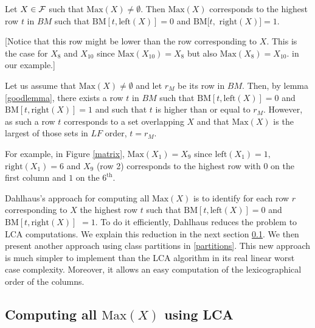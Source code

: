 \documentclass{llncs}
\begin{document}
\begin{lemma}
Let $X\in {\cal F}$ such that $\mbox{Max}(X)\not=\emptyset.$ Then
$\mbox{Max}(X)$ corresponds to the highest row $t$ in $BM$ such that
$\mbox{BM}[t,\mbox{left}(X)]=0$ and $\mbox{BM}[t,$ $\mbox{right}(X)]=1.$
\label{lemup}
\end{lemma}
\vspace*{-3mm}
[Notice that this row might be lower than the row corresponding to
  $X$. This is the case for $X_8$ and $X_{10}$ since
  $\mbox{Max}(X_{10})=X_8$ but also $\mbox{Max}(X_8)=X_{10}.$ in our example.]\\[3mm]
\begin{preuve}
 Let us assume that $\mbox{Max}(X)\not=\emptyset$ and let $r_M$ be its
 row in $BM.$ Then, by lemma \ref{goodlemma}, there exists a row $t$
 in $BM$ such that $\mbox{BM}[t,\mbox{left}(X)]=0$ and
 $\mbox{BM}[t,\mbox{right}(X)]=1$ and such that $t$ is higher than or
 equal to $r_M$. However, as such a row $t$ corresponds to a set
 overlapping $X$ and that $\mbox{Max}(X)$ is the largest of those
 sets in $LF$ order, $t=r_M$.
\end{preuve}















For example, in Figure \ref{matrix}, $\mbox{Max}(X_1) = X_9$ since
$\mbox{left}(X_1) = 1,$ $\mbox{right}(X_1) = 6$ and $X_9$ (row 2)
corresponds to the highest row with $0$ on the first column and $1$ on
the $6^{\mbox{th}}$.

Dahlhaus's approach for computing all $\mbox{Max}(X)$ is to identify for
each row $r$ corresponding to $X$ the highest row $t$ such that
$\mbox{BM}[t,\mbox{left}(X)]=0$ and $\mbox{BM}[t,\mbox{right}(X)]$ $=1.$
To do it efficiently, Dahlhaus reduces the problem to LCA
computations. We explain this reduction in the next section
\ref{LCA}. We then present another approach using class partitions
in \ref{partitions}. This new approach is much simpler to
implement than the LCA algorithm in its real linear worst case
complexity. Moreover, it allows an easy computation of the
lexicographical order of the columns.

\subsection{Computing all $\mbox{Max}(X)$ using LCA}
\label{LCA}
\end{document}
